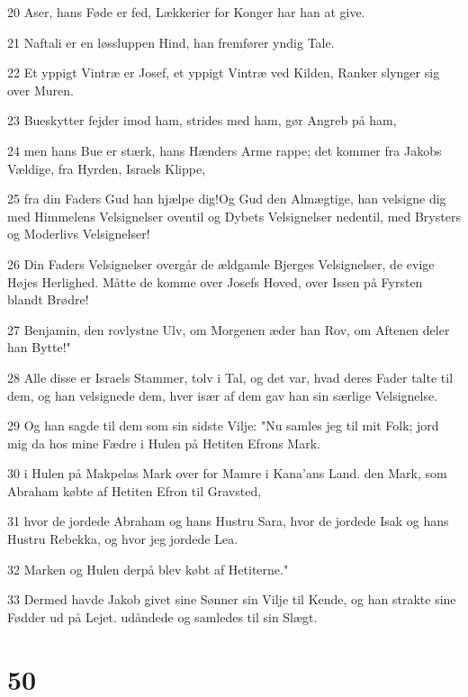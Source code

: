 \par 20 Aser, hans Føde er fed, Lækkerier for Konger har han at give.
\par 21 Naftali er en løssluppen Hind, han fremfører yndig Tale.
\par 22 Et yppigt Vintræ er Josef, et yppigt Vintræ ved Kilden, Ranker slynger sig over Muren.
\par 23 Bueskytter fejder imod ham, strides med ham, gør Angreb på ham,
\par 24 men hans Bue er stærk, hans Hænders Arme rappe; det kommer fra Jakobs Vældige, fra Hyrden, Israels Klippe,
\par 25 fra din Faders Gud han hjælpe dig!Og Gud den Almægtige, han velsigne dig med Himmelens Velsignelser oventil og Dybets Velsignelser nedentil, med Brysters og Moderlivs Velsignelser!
\par 26 Din Faders Velsignelser overgår de ældgamle Bjerges Velsignelser, de evige Højes Herlighed. Måtte de komme over Josefs Hoved, over Issen på Fyrsten blandt Brødre!
\par 27 Benjamin, den rovlystne Ulv, om Morgenen æder han Rov, om Aftenen deler han Bytte!"
\par 28 Alle disse er Israels Stammer, tolv i Tal, og det var, hvad deres Fader talte til dem, og han velsignede dem, hver især af dem gav han sin særlige Velsignelse.
\par 29 Og han sagde til dem som sin sidste Vilje: "Nu samles jeg til mit Folk; jord mig da hos mine Fædre i Hulen på Hetiten Efrons Mark.
\par 30 i Hulen på Makpelas Mark over for Mamre i Kana'ans Land. den Mark, som Abraham købte af Hetiten Efron til Gravsted,
\par 31 hvor de jordede Abraham og hans Hustru Sara, hvor de jordede Isak og hans Hustru Rebekka, og hvor jeg jordede Lea.
\par 32 Marken og Hulen derpå blev købt af Hetiterne."
\par 33 Dermed havde Jakob givet sine Sønner sin Vilje til Kende, og han strakte sine Fødder ud på Lejet. udåndede og samledes til sin Slægt.

\chapter{50}

